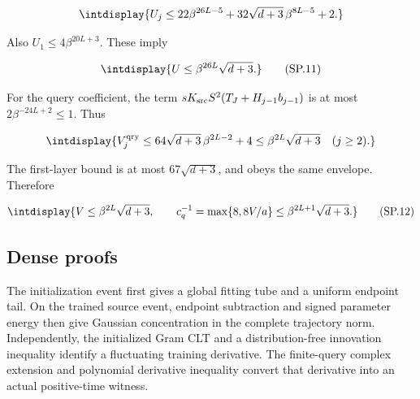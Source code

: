 \begingroup\renewcommand{\theHequation}{intdisplay.435}
\begin{equation*}
\intdisplay{
U_j\le22\beta^{26L-5}
 +32\sqrt{d+3}\,\beta^{8L-5}+2.
}
\end{equation*}
\endgroup


Also \(U_1\le4\beta^{20L+3}\). These imply


\begingroup\renewcommand{\theHequation}{intdisplay.436}
\begin{equation}
\intdisplay{
{U\le\beta^{26L}\sqrt{d+3}.}
}
\tag{SP.11}
\label{int:eq-0215-sp-11}
\end{equation}
\endgroup


For the query coefficient, the term \(sK_{\rm src}S^2(T_J+H_{j-1}b_{j-1})\) is at most \(2\beta^{-24L+2}\le1\). Thus


\begingroup\renewcommand{\theHequation}{intdisplay.437}
\begin{equation*}
\intdisplay{
V_j^{\rm qry}\le64\sqrt{d+3}\,\beta^{2L-2}+4
\le\beta^{2L}\sqrt{d+3}\quad(j\ge2).
}
\end{equation*}
\endgroup


The first-layer bound is at most \(67\sqrt{d+3}\), and obeys the same envelope. Therefore


\begingroup\renewcommand{\theHequation}{intdisplay.438}
\begin{equation}
\intdisplay{
{V\le\beta^{2L}\sqrt{d+3},\qquad
c_q^{-1}=\max\{8,8V/a\}\le\beta^{2L+1}\sqrt{d+3}.}
}
\tag{SP.12}
\label{int:eq-0216-sp-12}
\end{equation}
\endgroup

\subsection{Dense proofs}
\label{int:dense-proofs}


The initialization event first gives a global fitting tube and a uniform endpoint tail. On the trained source event, endpoint subtraction and signed parameter energy then give Gaussian concentration in the complete trajectory norm. Independently, the initialized Gram CLT and a distribution-free innovation inequality identify a fluctuating training derivative. The finite-query complex extension and polynomial derivative inequality convert that derivative into an actual positive-time witness.



